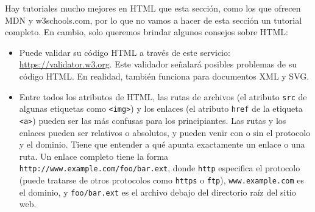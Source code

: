 \documentclass[12pt,]{krantz}
\theoremstyle{definition}
\theoremstyle{definition}
\theoremstyle{definition}
\theoremstyle{remark}
\begin{document}
Hay tutoriales mucho mejores en HTML que esta sección, como los que
ofrecen MDN y w3schools.com, por lo que no vamos a hacer de esta sección
un tutorial completo. En cambio, solo queremos brindar algunos consejos
sobre HTML:

\begin{itemize}
\item
  Puede validar su código HTML a través de este servicio:
  \url{https://validator.w3.org}. Este validador señalará posibles
  problemas de su código HTML. En realidad, también funciona para
  documentos XML y SVG.
\item
  Entre todos los atributos de HTML, las rutas de archivos (el atributo
  \texttt{src} de algunas etiquetas como
  \texttt{\textless{}img\textgreater{}}) y los enlaces (el atributo
  \texttt{href} de la etiqueta \texttt{\textless{}a\textgreater{}})
  pueden ser las más confusas para los principiantes. Las rutas y los
  enlaces pueden ser relativos o absolutos, y pueden venir con o sin el
  protocolo y el dominio. Tiene que entender a qué apunta exactamente un
  enlace o una ruta. Un enlace completo tiene la forma
  \texttt{http://www.example.com/foo/bar.ext}, donde \texttt{http}
  especifica el protocolo (puede tratarse de otros protocolos como
  \texttt{https} o \texttt{ftp}), \texttt{www.example.com} es el
  dominio, y \texttt{foo/bar.ext} es el archivo debajo del directorio
  raíz del sitio web.


\end{itemize}
\end{document}
